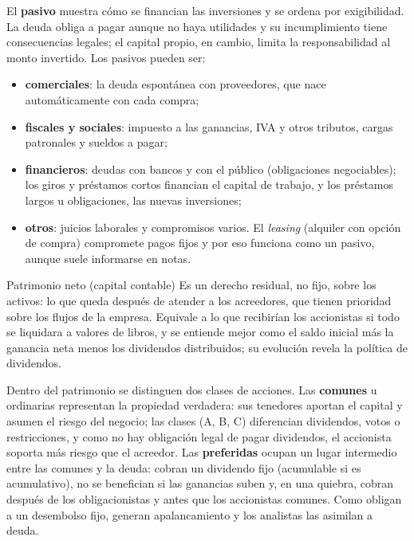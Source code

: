 El \textbf{pasivo} muestra cómo se financian las inversiones y se ordena por exigibilidad. La deuda obliga a pagar aunque no haya utilidades y su incumplimiento tiene consecuencias legales; el capital propio, en cambio, limita la responsabilidad al monto invertido. Los pasivos pueden ser:
\begin{itemize}
\item \textbf{comerciales}: la deuda espontánea con proveedores, que nace automáticamente con cada compra;
\item \textbf{fiscales y sociales}: impuesto a las ganancias, IVA y otros tributos, cargas patronales y sueldos a pagar;
\item \textbf{financieros}: deudas con bancos y con el público (obligaciones negociables); los giros y préstamos cortos financian el capital de trabajo, y los préstamos largos u obligaciones, las nuevas inversiones;
\item \textbf{otros}: juicios laborales y compromisos varios. El \emph{leasing} (alquiler con opción de compra) compromete pagos fijos y por eso funciona como un pasivo, aunque suele informarse en notas.
\end{itemize}

\begin{definicion}{Patrimonio neto (capital contable)}
Es un derecho residual, no fijo, sobre los activos: lo que queda después de atender a los acreedores, que tienen prioridad sobre los flujos de la empresa. Equivale a lo que recibirían los accionistas si todo se liquidara a valores de libros, y se entiende mejor como el saldo inicial más la ganancia neta menos los dividendos distribuidos; su evolución revela la política de dividendos.
\end{definicion}

Dentro del patrimonio se distinguen dos clases de acciones. Las \textbf{comunes} u ordinarias representan la propiedad verdadera: sus tenedores aportan el capital y asumen el riesgo del negocio; las clases (A, B, C) diferencian dividendos, votos o restricciones, y como no hay obligación legal de pagar dividendos, el accionista soporta más riesgo que el acreedor. Las \textbf{preferidas} ocupan un lugar intermedio entre las comunes y la deuda: cobran un dividendo fijo (acumulable si es acumulativo), no se benefician si las ganancias suben y, en una quiebra, cobran después de los obligacionistas y antes que los accionistas comunes. Como obligan a un desembolso fijo, generan apalancamiento y los analistas las asimilan a deuda.

